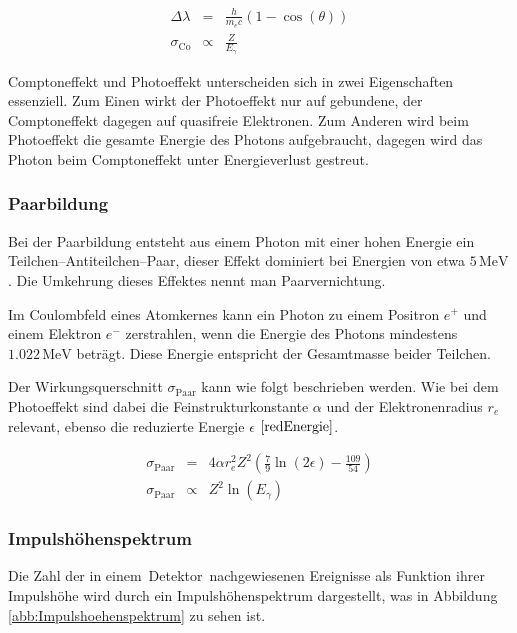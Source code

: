\documentclass[12pt,a4paper]{scrartcl}
\numberwithin{equation}{section} %
\newcommand{\pu}[1]{\ensuremath{\mathrm{#1}}}
\begin{document}
\begin{eqnarray}
    \Delta \lambda &=& \frac{h}{m_e c} (1 - \cos(\theta)) \\
    \sigma_\mathrm{Co} &\propto & \frac{Z}{E_\gamma}
\end{eqnarray}

\noindent
Comptoneffekt und Photoeffekt unterscheiden sich in zwei Eigenschaften essenziell. Zum Einen wirkt der Photoeffekt nur auf gebundene, der Comptoneffekt dagegen auf quasifreie Elektronen. Zum Anderen wird beim Photoeffekt die gesamte Energie des Photons aufgebraucht, dagegen wird das Photon beim Comptoneffekt unter Energieverlust gestreut.

\hypertarget{paarbildung}{%
\subsubsection{Paarbildung}\label{paarbildung}}

Bei der Paarbildung entsteht aus einem Photon mit einer hohen Energie ein Teilchen--Antiteilchen--Paar, dieser Effekt dominiert bei Energien von etwa $\pu{5\, MeV}$. Die Umkehrung dieses Effektes nennt man Paarvernichtung.

Im Coulombfeld eines Atomkernes kann ein Photon zu einem Positron $e^+$ und einem Elektron $e^-$ zerstrahlen, wenn die Energie des Photons mindestens $\pu{1.022\, MeV}$ beträgt. Diese Energie entspricht der Gesamtmasse beider Teilchen.

Der Wirkungsquerschnitt $\sigma_\mathrm{Paar}$ kann wie folgt beschrieben werden. Wie bei dem Photoeffekt sind dabei die Feinstrukturkonstante $\alpha$ und der Elektronenradius $r_e$ relevant, ebenso die reduzierte Energie $\epsilon$ $\eqref{redEnergie}$.

\begin{eqnarray}
    \sigma_\mathrm{Paar}
        &=& 4\alpha r_e^2 Z^2
            \left(\frac{7}{9} \ln(2\epsilon) - \frac{109}{54} \right) \\
    \sigma_\mathrm{Paar}
        &\propto& Z^2 \ln(E_\gamma)
\end{eqnarray}

\hypertarget{impulshuxf6henspektrum}{%
\subsubsection{Impulshöhenspektrum}\label{impulshuxf6henspektrum}}

Die Zahl der in einem~Detektor~nachgewiesenen Ereignisse als Funktion ihrer Impulshöhe wird durch ein Impulshöhenspektrum dargestellt, was in Abbildung \ref{abb:Impulshoehenspektrum} zu sehen ist. \cite{Impulshöhenspektrum}
\end{document}

